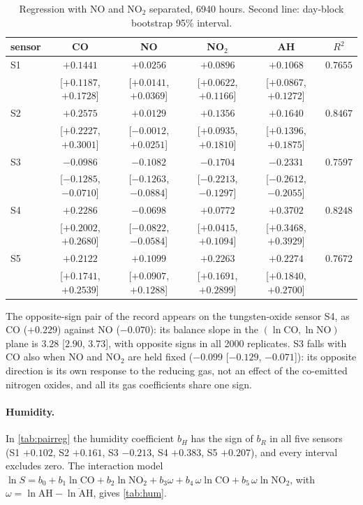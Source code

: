 \documentclass[11pt]{article}
\theoremstyle{definition}\newtheorem{definition}[theorem]{Definition}
\theoremstyle{remark}\newtheorem{remark}[theorem]{Remark}
\begin{document}
\begin{table}[htbp]\centering
\caption{Regression with NO and NO$_2$ separated, 6940 hours. Second line: day-block bootstrap 95\% interval.}\label{tab:no}
\footnotesize
\begin{tabular}{@{}lccccc@{}}\toprule
sensor & CO & NO & NO$_2$ & AH & $R^2$\\\midrule
S1 & $+0.1441$ & $+0.0256$ & $+0.0896$ & $+0.1068$ & $0.7655$\\
 & [$+0.1187$, $+0.1728$] & [$+0.0141$, $+0.0369$] & [$+0.0622$, $+0.1166$] & [$+0.0867$, $+0.1272$] & \\
S2 & $+0.2575$ & $+0.0129$ & $+0.1356$ & $+0.1640$ & $0.8467$\\
 & [$+0.2227$, $+0.3001$] & [$-0.0012$, $+0.0251$] & [$+0.0935$, $+0.1810$] & [$+0.1396$, $+0.1875$] & \\
S3 & $-0.0986$ & $-0.1082$ & $-0.1704$ & $-0.2331$ & $0.7597$\\
 & [$-0.1285$, $-0.0710$] & [$-0.1263$, $-0.0884$] & [$-0.2213$, $-0.1297$] & [$-0.2612$, $-0.2055$] & \\
S4 & $+0.2286$ & $\mathbf{-0.0698}$ & $+0.0772$ & $+0.3702$ & $0.8248$\\
 & [$+0.2002$, $+0.2680$] & [$-0.0822$, $-0.0584$] & [$+0.0415$, $+0.1094$] & [$+0.3468$, $+0.3929$] & \\
S5 & $+0.2122$ & $+0.1099$ & $+0.2263$ & $+0.2274$ & $0.7672$\\
 & [$+0.1741$, $+0.2539$] & [$+0.0907$, $+0.1288$] & [$+0.1691$, $+0.2899$] & [$+0.1840$, $+0.2700$] & \\\bottomrule
\end{tabular}
\end{table}

The opposite-sign pair of the record appears on the tungsten-oxide sensor S4, as CO ($+0.229$) against NO ($-0.070$): its balance slope in the $(\ln\mathrm{CO},\ln\mathrm{NO})$ plane is $3.28$ [$2.90$, $3.73$], with opposite signs in all 2000 replicates. S3 falls with CO also when NO and NO$_2$ are held fixed ($-0.099$ [$-0.129$, $-0.071$]): its opposite direction is its own response to the reducing gas, not an effect of the co-emitted nitrogen oxides, and all its gas coefficients share one sign.

\paragraph{Humidity.} In \cref{tab:pairreg} the humidity coefficient $b_H$ has the sign of $b_R$ in all five sensors (S1 $+0.102$, S2 $+0.161$, S3 $-0.213$, S4 $+0.383$, S5 $+0.207$), and every interval excludes zero. The interaction model $\ln S=b_0+b_1\ln\mathrm{CO}+b_2\ln\mathrm{NO_2}+b_3\omega+b_4\,\omega\ln\mathrm{CO}+b_5\,\omega\ln\mathrm{NO_2}$, with $\omega=\ln\mathrm{AH}-\overline{\ln\mathrm{AH}}$, gives \cref{tab:hum}.
\end{document}
